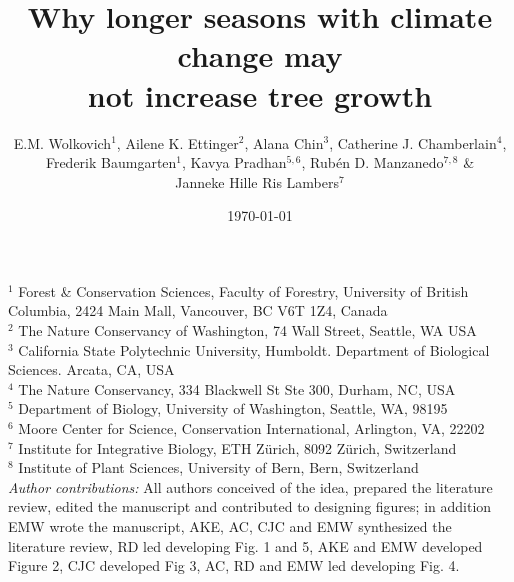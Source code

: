 \documentclass[11pt]{article}
\begin{document}
\renewcommand{\refname}{\CHead{}}


\title{Why longer seasons with climate change may \\ not increase tree growth} 
\author{E.M. Wolkovich$^1$, Ailene K. Ettinger$^2$, Alana Chin$^3$, Catherine J. Chamberlain$^4$,\\ Frederik Baumgarten$^1$, Kavya Pradhan$^{5,6}$, Rub{\'e}n D. Manzanedo$^{7,8}$ \& \\ Janneke Hille Ris Lambers$^7$}
\date{\today}
\maketitle

$^1$ Forest \& Conservation Sciences, Faculty of Forestry, University of British Columbia, 2424 Main Mall, Vancouver, BC V6T 1Z4, Canada\\
$^2$ The Nature Conservancy of Washington, 74 Wall Street, Seattle, WA  USA \\
$^3$ California State Polytechnic University, Humboldt. Department of Biological Sciences. Arcata, CA, USA \\
$^4$ The Nature Conservancy, 334 Blackwell St Ste 300, Durham, NC, USA \\ 
$^5$ Department of Biology, University of Washington, Seattle, WA, 98195 \\
$^6$ Moore Center for Science, Conservation International, Arlington, VA, 22202 \\ %
$^7$ Institute for Integrative Biology, ETH Z{\"u}rich, 8092 Z{\"u}rich, Switzerland \\ %
$^8$ Institute of Plant Sciences, University of Bern, Bern, Switzerland \\

\emph{Author contributions:}  All authors conceived of the idea, prepared the literature review, edited the manuscript and contributed to designing figures; in addition EMW wrote the manuscript, AKE, AC, CJC  and EMW synthesized the literature review, RD led developing Fig. 1 and 5, AKE and EMW developed Figure 2, CJC developed Fig 3, AC, RD and EMW led developing Fig. 4. 
\end{document}
